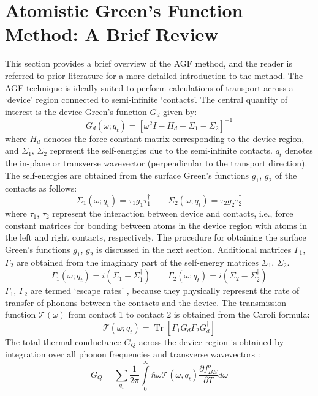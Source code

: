 \documentclass[11pt]{article}
\DeclareMathOperator{\Tr}{Tr}
\begin{document}
\section{Atomistic Green's Function Method: A Brief Review}
This section provides a brief overview of the AGF method, and the reader is referred to prior literature \cite{zhang2007atomistic,sadasivam2014atomistic} for a more detailed introduction to the method. The AGF technique is ideally suited to perform calculations of transport across a `device' region connected to semi-infinite `contacts'. The central quantity of interest is the device Green's function $G_d$ given by:
\begin{equation}
G_d(\omega;q_{t}) = [\omega^2I-H_d-\Sigma_1-\Sigma_2]^{-1}
\end{equation}
where $H_d$ denotes the force constant matrix corresponding to the device region, and $\Sigma_1$, $\Sigma_2$ represent the self-energies due to the semi-infinite contacts. $q_{t}$ denotes the in-plane or transverse wavevector (perpendicular to the transport direction). The self-energies are obtained from the surface Green's functions $g_1$, $g_2$ of the contacts as follows:
\begin{equation}
\Sigma_1(\omega;q_{t}) = \tau_1g_1\tau_1^{\dagger} \qquad \Sigma_2(\omega;q_{t}) = \tau_2g_2\tau_2^{\dagger}
\end{equation}
where $\tau_1$, $\tau_2$ represent the interaction between device and contacts, i.e., force constant matrices for bonding between atoms in the device region with atoms in the left and right contacts, respectively. The procedure for obtaining the surface Green's functions $g_1$, $g_2$ is discussed in the next section. Additional matrices $\Gamma_1$, $\Gamma_2$ are obtained from the imaginary part of the self-energy matrices $\Sigma_1$, $\Sigma_2$.
\begin{equation}
\Gamma_1(\omega;q_{t}) = i(\Sigma_1-\Sigma_1^\dagger) \qquad \Gamma_2(\omega;q_{t}) = i(\Sigma_2-\Sigma_2^\dagger)
\end{equation}
$\Gamma_1$, $\Gamma_2$ are termed `escape rates' \cite{sadasivam2014atomistic}, because they physically represent the rate of transfer of phonons between the contacts and the device. The transmission function $\mathcal{T}(\omega)$ from contact 1 to contact 2 is obtained from the Caroli formula:
\begin{equation}
\mathcal{T}(\omega;q_{t}) = \Tr[\Gamma_1G_d\Gamma_2G_d^{\dagger}]
\label{Caroli_formula} 
\end{equation}
The total thermal conductance $G_Q$ across the device region is obtained by integration over all phonon frequencies and transverse wavevectors \cite{zhang2007simulation}:
\begin{equation}
G_{Q} = \sum\limits_{q_{t}}{\frac{1}{2\pi}\int\limits_{0}^{\infty}{\hbar\omega}\mathcal{T}(\omega,q_{t})\frac{\partial f_{BE}^o}{\partial T}d\omega}
\end{equation}
\end{document}
